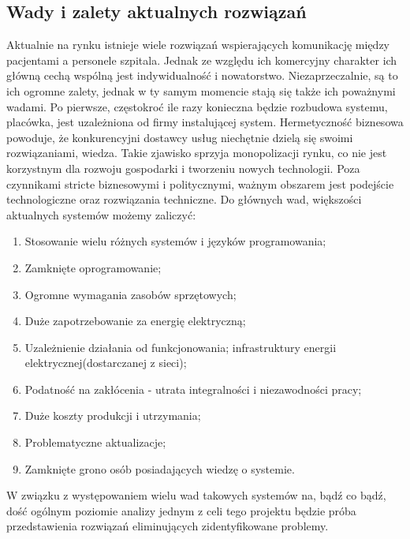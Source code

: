 \documentclass[12pt]{article} %
\begin{document}
\subsection{Wady i zalety aktualnych rozwiązań} %
Aktualnie na rynku istnieje wiele rozwiązań wspierających komunikację między pacjentami a personele szpitala. Jednak ze względu ich komercyjny charakter ich główną cechą wspólną jest indywidualność i nowatorstwo. Niezaprzeczalnie, są to ich ogromne zalety, jednak w ty samym momencie stają się także ich poważnymi wadami. Po pierwsze, częstokroć ile razy konieczna będzie rozbudowa systemu, placówka, jest uzależniona od firmy instalującej system. Hermetyczność biznesowa powoduje, że konkurencyjni dostawcy usług niechętnie dzielą się swoimi rozwiązaniami, wiedza. Takie zjawisko sprzyja monopolizacji rynku, co nie jest korzystnym dla rozwoju gospodarki i tworzeniu nowych technologii. Poza czynnikami stricte biznesowymi i politycznymi, ważnym obszarem jest podejście technologiczne oraz rozwiązania techniczne. Do głównych wad, większości aktualnych systemów możemy zaliczyć:
\begin{enumerate}
\item Stosowanie wielu różnych systemów i języków programowania;
\item Zamknięte oprogramowanie;
\item Ogromne wymagania zasobów sprzętowych;
\item Duże zapotrzebowanie za energię elektryczną;
\item Uzależnienie działania od funkcjonowania; infrastruktury energii elektrycznej(dostarczanej z sieci);
\item Podatność na zakłócenia - utrata integralności i niezawodności pracy;
\item Duże koszty produkcji i utrzymania;
\item Problematyczne aktualizacje;
\item Zamknięte grono osób posiadających wiedzę o systemie.
\end{enumerate}

W związku z występowaniem wielu wad takowych systemów na, bądź co bądź, dość ogólnym poziomie analizy jednym z celi tego projektu będzie próba przedstawienia rozwiązań eliminujących zidentyfikowane problemy.



\end{document}
